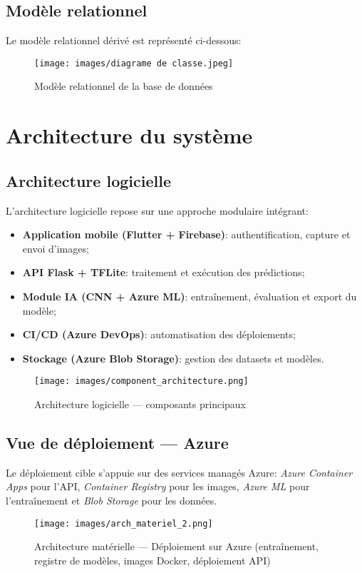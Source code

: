 \documentclass[12pt,a4paper]{report}
\begin{document}
\subsection{Modèle relationnel}
Le modèle relationnel dérivé est représenté ci-dessous:
\begin{figure}[H]
    \centering
    \texttt{[image: images/diagrame de classe.jpeg]}
    \caption{Modèle relationnel de la base de données}
\end{figure}
\cleardoublepage
\section{Architecture du système}

\subsection{Architecture logicielle}
L’architecture logicielle repose sur une approche modulaire intégrant:
\begin{itemize}
    \item \textbf{Application mobile (Flutter + Firebase)}: authentification, capture et envoi d’images;
    \item \textbf{API Flask + TFLite}: traitement et exécution des prédictions;
    \item \textbf{Module IA (CNN + Azure ML)}: entraînement, évaluation et export du modèle;
    \item \textbf{CI/CD (Azure DevOps)}: automatisation des déploiements;
    \item \textbf{Stockage (Azure Blob Storage)}: gestion des datasets et modèles.
\end{itemize}
\begin{figure}[H]
    \centering
    \texttt{[image: images/component\_architecture.png]}
    \caption{Architecture logicielle — composants principaux}
    \label{fig:arch-logicielle}
\end{figure}
\cleardoublepage
\subsection*{Vue de déploiement — Azure}
Le déploiement cible s’appuie sur des services managés Azure:
\textit{Azure Container Apps} pour l’API, \textit{Container Registry} pour les images,
\textit{Azure ML} pour l’entraînement et \textit{Blob Storage} pour les données.
\begin{figure}[H]
    \centering
    \texttt{[image: images/arch\_materiel\_2.png]}
    \caption{Architecture matérielle — Déploiement sur Azure (entraîne\-ment, registre de modèles, images Docker, déploiement API)}
    \label{fig:arch-azure}
\end{figure}
\cleardoublepage
\end{document}
